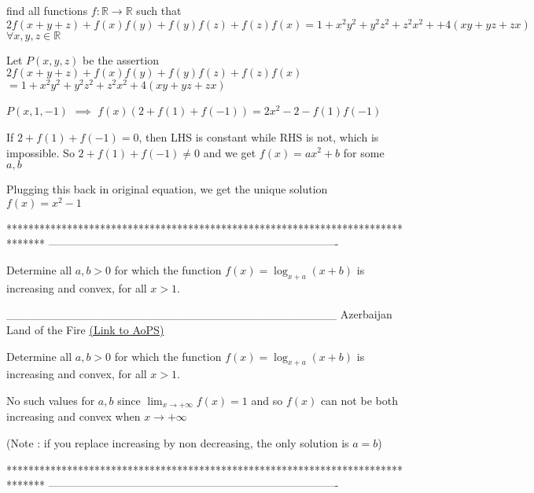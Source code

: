 \begin{solution}
	\begin{tcolorbox}find all functions $f:\mathbb{R}\to\mathbb{R}$ such that 
$2f(x+y+z)+f(x)f(y)+f(y)f(z)+f(z)f(x)=1+x^2y^2+y^2z^2+z^2x^2+
                                                                       +4(xy+yz+zx)$
$\forall x,y,z\in\mathbb{R}$\end{tcolorbox}
Let $P(x,y,z)$ be the assertion $2f(x+y+z)+f(x)f(y)+f(y)f(z)+f(z)f(x)$ $=1+x^2y^2+y^2z^2+z^2x^2+4(xy+yz+zx)$

$P(x,1,-1)$ $\implies$ $f(x)(2+f(1)+f(-1))=2x^2-2-f(1)f(-1)$

If $2+f(1)+f(-1)=0$, then LHS is constant while RHS is not, which is impossible. So $2+f(1)+f(-1)\ne 0$ and we get $f(x)=ax^2+b$ for some $a,b$

Plugging this back in original equation, we get the unique solution $\boxed{f(x)=x^2-1}$
\end{solution}
*******************************************************************************
-------------------------------------------------------------------------------

\begin{problem}
	Determine all $a,b>0$ for which the function $f(x)=\log_{x+a}(x+b)$ is increasing and convex, for all $x>1$.

________________________________________
Azerbaijan Land of the Fire 
	\flushright \href{https://artofproblemsolving.com/community/c6h527821}{(Link to AoPS)}
\end{problem}



\begin{solution}
	\begin{tcolorbox}Determine all $a,b>0$ for which the function $f(x)=\log_{x+a}(x+b)$ is increasing and convex, for all $x>1$.\end{tcolorbox}
No such values for $a,b$ since $\lim_{x\to+\infty}f(x)=1$ and so $f(x)$ can not be both increasing and convex when $x\to+\infty$

(Note : if you replace increasing by non decreasing, the only solution is $a=b$)
\end{solution}
*******************************************************************************
-------------------------------------------------------------------------------

